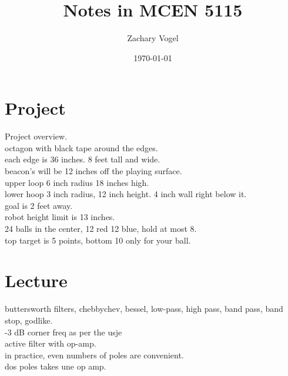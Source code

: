 \documentclass{article}
\author{Zachary Vogel}
\date{\today}
\title{Notes in MCEN 5115}
\begin{document}
\maketitle


\section*{Project}
Project overview.\\
octagon with black tape around the edges.\\
each edge is 36 inches. 8 feet tall and wide.\\
beacon's will be 12 inches off the playing surface.\\
upper loop 6 inch radius 18 inches high.\\
lower hoop 3 inch radius, 12 inch height. 4 inch wall right below it.\\
goal is 2 feet away.\\
robot height limit is 13 inches.\\
24 balls in the center, 12 red 12 blue, hold at most 8.\\
top target is 5 points, bottom 10 only for your ball.\\

\section*{Lecture}
buttersworth filters, chebbychev, bessel, low-pass, high pass, band pass, band stop, godlike.\\
-3 dB corner freq as per the usje\\
active filter with op-amp.\\
in practice, even numbers of poles are convenient.\\
dos poles takes une op amp.
\end{document}
